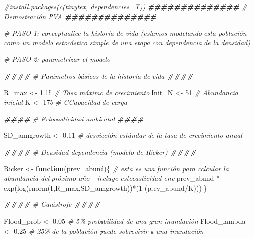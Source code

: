 \documentclass[
]{article}
\newenvironment{Shaded}{\begin{snugshade}}{\end{snugshade}}
\newcommand{\CommentTok}[1]{\textcolor[rgb]{0.56,0.35,0.01}{\textit{#1}}}
\newcommand{\ControlFlowTok}[1]{\textcolor[rgb]{0.13,0.29,0.53}{\textbf{#1}}}
\newcommand{\DecValTok}[1]{\textcolor[rgb]{0.00,0.00,0.81}{#1}}
\newcommand{\DocumentationTok}[1]{\textcolor[rgb]{0.56,0.35,0.01}{\textbf{\textit{#1}}}}
\newcommand{\FloatTok}[1]{\textcolor[rgb]{0.00,0.00,0.81}{#1}}
\newcommand{\FunctionTok}[1]{\textcolor[rgb]{0.00,0.00,0.00}{#1}}
\newcommand{\NormalTok}[1]{#1}
\newcommand{\OtherTok}[1]{\textcolor[rgb]{0.56,0.35,0.01}{#1}}
\newcommand{\SpecialCharTok}[1]{\textcolor[rgb]{0.00,0.00,0.00}{#1}}
\begin{document}
\begin{Shaded}
\begin{Highlighting}[]
\CommentTok{\#install.packages(c(\textquotesingle{}tinytex\textquotesingle{}, dependencies=T))}
\DocumentationTok{\#\#\#\#\#\#\#\#\#\#\#\#\#\#}
\CommentTok{\# Demostración PVA}
\DocumentationTok{\#\#\#\#\#\#\#\#\#\#\#\#\#\#}

\CommentTok{\# PASO 1: conceptualice la historia de vida (estamos modelando esta población como un modelo estocástico simple de una etapa con dependencia de la densidad)}

\CommentTok{\# PASO 2: parametrizar el modelo}

\DocumentationTok{\#\#\#\#}
\CommentTok{\# Parámetros básicos de la historia de vida}
\DocumentationTok{\#\#\#\#}

\NormalTok{R\_max }\OtherTok{\textless{}{-}} \FloatTok{1.15}       \CommentTok{\# Tasa máxima de crecimiento}
\NormalTok{Init\_N }\OtherTok{\textless{}{-}} \DecValTok{51}        \CommentTok{\# Abundancia inicial}
\NormalTok{K }\OtherTok{\textless{}{-}} \DecValTok{175}            \CommentTok{\# CCapacidad de carga}

\DocumentationTok{\#\#\#\#}
\CommentTok{\# Estocasticidad ambiental}
\DocumentationTok{\#\#\#\#}

\NormalTok{SD\_anngrowth }\OtherTok{\textless{}{-}} \FloatTok{0.11}  \CommentTok{\# desviación estándar de la tasa de crecimiento anual}

\DocumentationTok{\#\#\#\#}
\CommentTok{\# Densidad{-}dependencia (modelo de Ricker)}
\DocumentationTok{\#\#\#\#}

\NormalTok{Ricker }\OtherTok{\textless{}{-}} \ControlFlowTok{function}\NormalTok{(prev\_abund)\{       }\CommentTok{\# esta es una función para calcular la abundancia del próximo año {-} incluye estocasticidad env}
\NormalTok{  prev\_abund }\SpecialCharTok{*} \FunctionTok{exp}\NormalTok{(}\FunctionTok{log}\NormalTok{(}\FunctionTok{rnorm}\NormalTok{(}\DecValTok{1}\NormalTok{,R\_max,SD\_anngrowth))}\SpecialCharTok{*}\NormalTok{(}\DecValTok{1}\SpecialCharTok{{-}}\NormalTok{(prev\_abund}\SpecialCharTok{/}\NormalTok{K)))}
\NormalTok{\}}

\DocumentationTok{\#\#\#\#}
\CommentTok{\# Catástrofe}
\DocumentationTok{\#\#\#\#}

\NormalTok{Flood\_prob }\OtherTok{\textless{}{-}} \FloatTok{0.05}      \CommentTok{\# 5\% probabilidad de una gran inundación}
\NormalTok{Flood\_lambda }\OtherTok{\textless{}{-}} \FloatTok{0.25}    \CommentTok{\# 25\% de la población puede sobrevivir a una inundación}
\end{Highlighting}
\end{Shaded}
\end{document}
